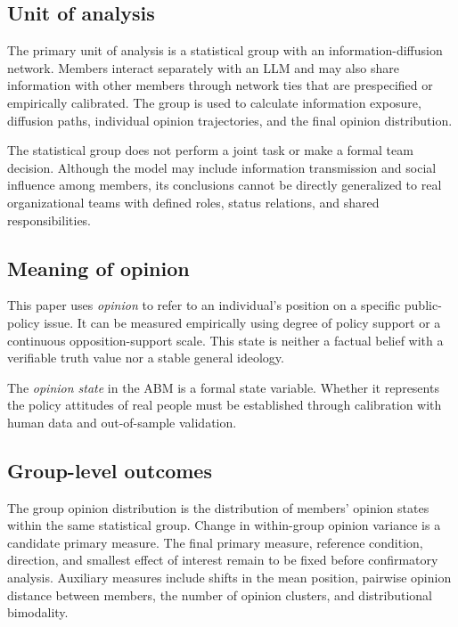 \documentclass[11pt,a4paper]{article}
\newcommand{\term}[1]{\textit{#1}}
\begin{document}
\subsection{Unit of analysis}

The primary unit of analysis is a statistical group with an information-diffusion network. Members interact separately with an LLM and may also share information with other members through network ties that are prespecified or empirically calibrated. The group is used to calculate information exposure, diffusion paths, individual opinion trajectories, and the final opinion distribution.

The statistical group does not perform a joint task or make a formal team decision. Although the model may include information transmission and social influence among members, its conclusions cannot be directly generalized to real organizational teams with defined roles, status relations, and shared responsibilities.

\subsection{Meaning of opinion}

This paper uses \term{opinion} to refer to an individual's position on a specific public-policy issue. It can be measured empirically using degree of policy support or a continuous opposition-support scale. This state is neither a factual belief with a verifiable truth value nor a stable general ideology.

The \term{opinion state} in the ABM is a formal state variable. Whether it represents the policy attitudes of real people must be established through calibration with human data and out-of-sample validation.

\subsection{Group-level outcomes}

The group opinion distribution is the distribution of members' opinion states within the same statistical group. Change in within-group opinion variance is a candidate primary measure. The final primary measure, reference condition, direction, and smallest effect of interest remain to be fixed before confirmatory analysis. Auxiliary measures include shifts in the mean position, pairwise opinion distance between members, the number of opinion clusters, and distributional bimodality.
\end{document}
